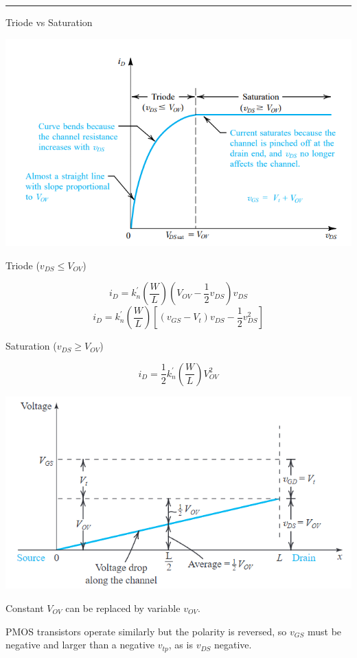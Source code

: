 \documentclass[a4paper]{article}
\begin{document}
\begin{multicols}{3}
\hrule
\vspace{1mm}
Triode vs Saturation

\includegraphics[width=\linewidth]{imgs/triode_sat.png}

Triode ($v_{DS} \leq V_{OV}$)

$$i_D=k_n^{'}\left(\frac{W}{L}\right)\left(V_{OV}-\frac{1}{2}v_{DS}\right)v_{DS}$$
$$i_D=k_n^{'}\left(\frac{W}{L}\right)\left[(v_{GS}-V_t)v_{DS}-\frac{1}{2}v_{DS}^2\right]$$

Saturation ($v_{DS} \geq V_{OV}$)

$$i_D=\frac{1}{2}k_n^{'}\left(\frac{W}{L}\right)V_{OV}^2$$

\includegraphics[width=\linewidth]{imgs/mosfet_sat.png}

Constant $V_{OV}$ can be replaced by variable $v_{OV}$.

PMOS transistors operate similarly but the polarity is
reversed, so $v_{GS}$ must be negative and larger than 
a negative $v_{tp}$, as is $v_{DS}$ negative.


\end{multicols}
\end{document}
